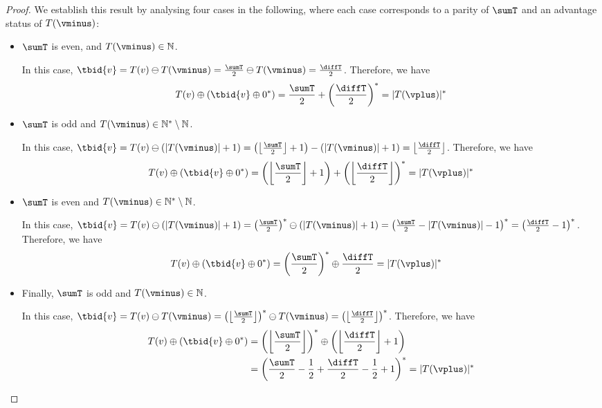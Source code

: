 \documentclass{theoretics}
\newcommand{\Nat}{\mathbb{N}}
\newcommand{\Natstro}{\mathbb{N}^* \setminus \mathbb{N}}
\newcommand{\succb}[1]{#1 \oplus 0^*\xspace}
\newcommand{\succInt}[1]{\left(#1\right)^*}
\DeclarePairedDelimiter{\adjustfloor}{\lfloor}{\rfloor}
\newcommand{\floor}[1]{\adjustfloor*{#1}}
\newcommand{\adjustbrac}[1]{\left(#1\right)}
\newcommand{\absolut}[1]{|#1|}
\newcommand{\half}[1]{\frac{#1}{2}}
\begin{document}
\begin{proof}
	We establish this result by analysing four cases in the following, where each case corresponds to a parity of \(\sumT\) and an advantage status of \(T(\vminus)\):
	
	\begin{itemize}
		\item \(\sumT\) is even, and \(T(\vminus) \in \Nat\). 
		
		In this case, \(\tbid{v} = T(v) \ominus T(\vminus) = \frac{\sumT}{2} \ominus T(\vminus) = \frac{\diffT}{2}\). 
		Therefore, we have 
		\begin{align*}
			T(v) \oplus (\succb{\tbid{v}}) = \frac{\sumT}{2} +  \succInt{\frac{\diffT}{2}} = \absolut{T(\vplus)}^*
		\end{align*}
	
	\item \(\sumT\) is odd and \(T(\vminus) \in \Natstro\). 
	
	In this case, \(\tbid{v} = T(v) \ominus (\absolut{T(\vminus)} + 1) = \left(\floor{\frac{\sumT}{2}} + 1\right) - (\absolut{T(\vminus)} + 1) = \floor{\frac{\diffT}{2}}\).
	Therefore, we have
	\begin{align*}
		T(v) \oplus (\succb{\tbid{v}}) = \adjustbrac{\floor{\frac{\sumT}{2}} +1} + \adjustbrac{\floor{\frac{\diffT}{2}}}^* = \absolut{T(\vplus)}^* 
	\end{align*} 

	\item \(\sumT\) is even and \(T(\vminus) \in \Natstro\). 
	
	In this case, \(\tbid{v} = T(v) \ominus (\absolut{T(\vminus)} + 1) = \succInt{\frac{\sumT}{2}} \ominus (\absolut{T(\vminus)} + 1) \linebreak = \succInt{\frac{\sumT}{2} - \absolut{T(\vminus)} - 1} = \succInt{\frac{\diffT}{2} - 1}\). 
	Therefore, we have 
	\begin{align*}
		T(v) \oplus (\succb{\tbid{v}}) &= \succInt{\frac{\sumT}{2}} \oplus \frac{\diffT}{2} = \absolut{T(\vplus)}^*
	\end{align*}

	\item Finally, \(\sumT\) is odd and \(T(\vminus) \in \Nat\). 
	
	In this case, \(\tbid{v} = T(v) \ominus T(\vminus) = \succInt{\floor{\frac{\sumT}{2}}} \ominus T(\vminus) = \succInt{\floor{\frac{\diffT}{2}}}\). 
	Therefore, we have
	\begin{align*}
		T(v) \oplus (\succb{\tbid{v}}) &= \succInt{\floor{\frac{\sumT}{2}}} \oplus \adjustbrac{\floor{\frac{\diffT}{2}} + 1} \\
		&= \succInt{\frac{\sumT}{2} - \half{1} + \half{\diffT} - \half{1} + 1} = \absolut{T(\vplus)}^*
	\end{align*}
	\end{itemize}
\end{proof}
\end{document}
